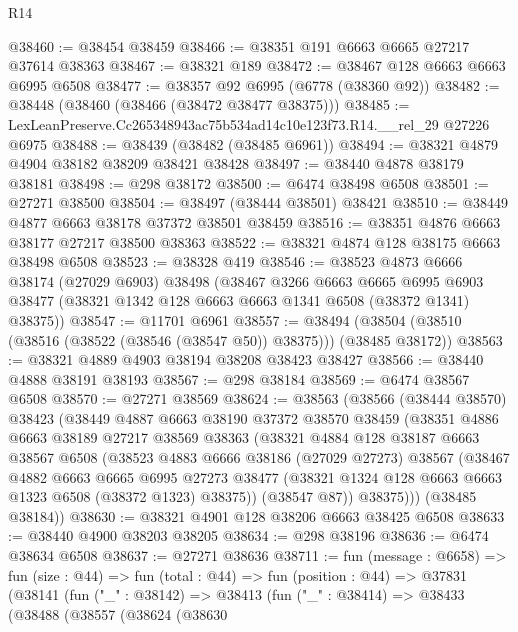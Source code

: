 \begin{lexlean}{R14}
\begin{coremodule}
@38460 := @38454 @38459
@38466 := @38351 @191 @6663 @6665 @27217 @37614 @38363
@38467 := @38321 @189
@38472 := @38467 @128 @6663 @6663 @6995 @6508
@38477 := @38357 @92 @6995 (@6778 (@38360 @92))
@38482 := @38448 (@38460 (@38466 (@38472 @38477 @38375)))
@38485 := LexLeanPreserve.Cc265348943ac75b534ad14c10e123f73.R14.__rel_29 @27226 @6975
@38488 := @38439 (@38482 (@38485 @6961))
@38494 := @38321 @4879 @4904 @38182 @38209 @38421 @38428
@38497 := @38440 @4878 @38179 @38181
@38498 := @298 @38172
@38500 := @6474 @38498 @6508
@38501 := @27271 @38500
@38504 := @38497 (@38444 @38501) @38421
@38510 := @38449 @4877 @6663 @38178 @37372 @38501 @38459
@38516 := @38351 @4876 @6663 @38177 @27217 @38500 @38363
@38522 := @38321 @4874 @128 @38175 @6663 @38498 @6508
@38523 := @38328 @419
@38546 := @38523
    @4873
    @6666
    @38174
    (@27029 @6903)
    @38498
    (@38467
      @3266
      @6663
      @6665
      @6995
      @6903
      @38477
      (@38321 @1342 @128 @6663 @6663 @1341 @6508 (@38372 @1341) @38375))
@38547 := @11701 @6961
@38557 := @38494 (@38504 (@38510 (@38516 (@38522 (@38546 (@38547 @50)) @38375))) (@38485 @38172))
@38563 := @38321 @4889 @4903 @38194 @38208 @38423 @38427
@38566 := @38440 @4888 @38191 @38193
@38567 := @298 @38184
@38569 := @6474 @38567 @6508
@38570 := @27271 @38569
@38624 := @38563
    (@38566
      (@38444 @38570)
      @38423
      (@38449
        @4887
        @6663
        @38190
        @37372
        @38570
        @38459
        (@38351
          @4886
          @6663
          @38189
          @27217
          @38569
          @38363
          (@38321
            @4884
            @128
            @38187
            @6663
            @38567
            @6508
            (@38523
              @4883
              @6666
              @38186
              (@27029 @27273)
              @38567
              (@38467
                @4882
                @6663
                @6665
                @6995
                @27273
                @38477
                (@38321 @1324 @128 @6663 @6663 @1323 @6508 (@38372 @1323) @38375))
              (@38547 @87))
            @38375)))
      (@38485 @38184))
@38630 := @38321 @4901 @128 @38206 @6663 @38425 @6508
@38633 := @38440 @4900 @38203 @38205
@38634 := @298 @38196
@38636 := @6474 @38634 @6508
@38637 := @27271 @38636
@38711 := fun (message : @6658) =>
  fun (size : @44) =>
  fun (total : @44) =>
  fun (position : @44) =>
  @37831
    (@38141
      (fun ("_" : @38142) =>
      @38413
        (fun ("_" : @38414) =>
        @38433
          (@38488
            (@38557
              (@38624
                (@38630

\end{coremodule}
\end{lexlean}
